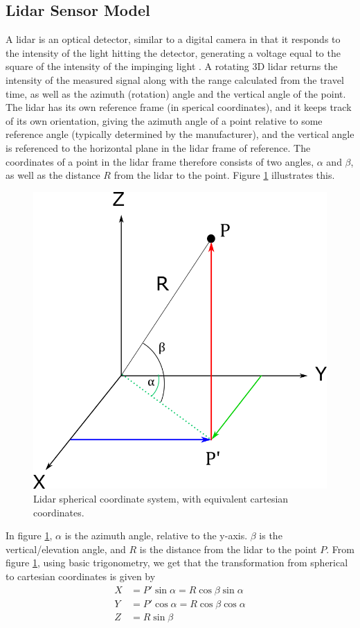 \subsection{Lidar Sensor Model}
A lidar is an optical detector, similar to a digital camera in that it responds to the intensity of the light hitting the detector, generating a voltage equal to the square of the intensity of the impinging light \cite{SpieLidar}. A rotating 3D lidar returns the intensity of the measured signal along with the range calculated from the travel time, as well as the azimuth (rotation) angle and the vertical angle of the point. The lidar has its own reference frame (in sperical coordinates), and it keeps track of its own orientation, giving the azimuth angle of a point relative to some reference angle (typically determined by the manufacturer), and the vertical angle is referenced to the horizontal plane in the lidar frame of reference. The coordinates of a point in the lidar frame therefore consists of two angles, $\alpha$ and $\beta$, as well as the distance $R$ from the lidar to the point. Figure \ref{fig:lidar_spherical} illustrates this.
\begin{figure}[H]
    \centering
    \includegraphics[width=.6\linewidth]{fig/sperical_to_cartesian.png}
    \caption{Lidar spherical coordinate system, with equivalent cartesian coordinates.}
    \label{fig:lidar_spherical}
\end{figure}
In figure \ref{fig:lidar_spherical}, $\alpha$ is the azimuth angle, relative to the y-axis. $\beta$ is the vertical/elevation angle, and $R$ is the distance from the lidar to the point $P$.
From figure \ref{fig:lidar_spherical}, using basic trigonometry, we get that the transformation from spherical to cartesian coordinates is given by
\begin{equation}
\label{eq:spheric_to_cartesian}
    \begin{split}
        X&=P'\sin{\alpha}=R\cos{\beta}\sin{\alpha}\\
        Y&=P'\cos{\alpha}=R\cos{\beta}\cos{\alpha}\\
        Z&=R\sin{\beta}
    \end{split}
\end{equation}
